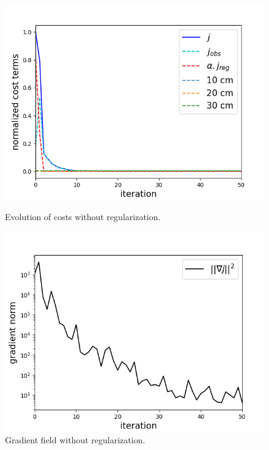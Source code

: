 \documentclass{article}
\begin{document}
\begin{figure}[H]
    \centering
    \begin{minipage}[b]{0.45\linewidth}
        \centering
        \includegraphics[width=\linewidth]{Images_Ayoub/No_Regularisation/Costs.png}
        \caption{Evolution of costs without regularization.}
        \label{fig:costs}
    \end{minipage}
    \hfill
    \begin{minipage}[b]{0.45\linewidth}
        \centering
        \includegraphics[width=\linewidth]{Images_Ayoub/No_Regularisation/Gradient.png}
        \caption{Gradient field without regularization.}
        \label{fig:gradient}
    \end{minipage}


\end{figure}
\end{document}
